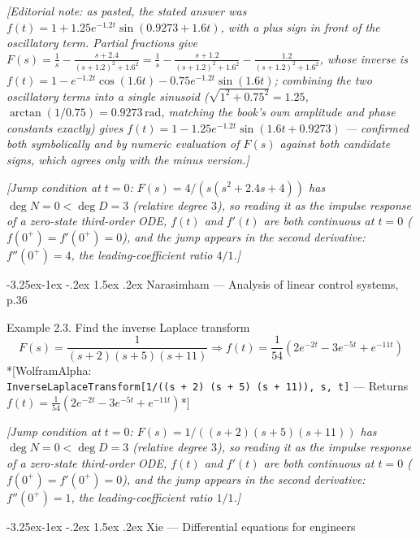 \documentclass[
  11pt,
]{article}
\makeatletter
\providecommand{\implies}{\Longrightarrow}
\renewcommand\paragraph{\@startsection{paragraph}{4}{\z@}%
                                     {-3.25ex\@plus -1ex \@minus -.2ex}%
                                     {1.5ex \@plus .2ex}%
                                     {\normalfont\normalsize\bfseries}}
\makeatother
\begin{document}
\emph{{[}Editorial note: as pasted, the stated answer was
\(f(t) = 1 + 1.25e^{-1.2t}\sin(0.9273 + 1.6t)\), with a plus sign in
front of the oscillatory term. Partial fractions give
\(F(s)=\frac{1}{s}-\frac{s+2.4}{(s+1.2)^2+1.6^2}=\frac{1}{s}-\frac{s+1.2}{(s+1.2)^2+1.6^2}-\frac{1.2}{(s+1.2)^2+1.6^2}\),
whose inverse is \(f(t)=1-e^{-1.2t}\cos(1.6t)-0.75e^{-1.2t}\sin(1.6t)\);
combining the two oscillatory terms into a single sinusoid
(\(\sqrt{1^2+0.75^2}=1.25\), \(\arctan(1/0.75)=0.9273\,\text{rad}\),
matching the book's own amplitude and phase constants exactly) gives
\(f(t)=1-1.25e^{-1.2t}\sin(1.6t+0.9273)\) --- confirmed both
symbolically and by numeric evaluation of \(F(s)\) against both
candidate signs, which agrees only with the minus version.{]}}

\emph{{[}Jump condition at \(t=0\): \(F(s)=4/(s(s^2+2.4s+4))\) has
\(\deg N=0<\deg D=3\) (relative degree \(3\)), so reading it as the
impulse response of a zero-state third-order ODE, \(f(t)\) and \(f'(t)\)
are both continuous at \(t=0\) (\(f(0^+)=f'(0^+)=0\)), and the jump
appears in the second derivative: \(f''(0^+)=4\), the
leading-coefficient ratio \(4/1\).{]}}

\hypertarget{narasimham-analysis-of-linear-control-systems-p.36}{%
\paragraph{Narasimham --- Analysis of linear control systems,
p.36}\label{narasimham-analysis-of-linear-control-systems-p.36}}

Example 2.3. Find the inverse Laplace transform \[
F(s) = \frac{1}{(s+2)(s+5)(s+11)} \implies f(t) = \frac{1}{54}\left(2e^{-2t} - 3e^{-5t} + e^{-11t}\right)
\] *{[}WolframAlpha:
\texttt{InverseLaplaceTransform{[}1/((s\ +\ 2)\ (s\ +\ 5)\ (s\ +\ 11)),\ s,\ t{]}}
--- Returns
\(f(t) = \frac{1}{54}\left(2e^{-2t} - 3e^{-5t} + e^{-11t}\right)\)*{]}

\emph{{[}Jump condition at \(t=0\): \(F(s)=1/((s+2)(s+5)(s+11))\) has
\(\deg N=0<\deg D=3\) (relative degree \(3\)), so reading it as the
impulse response of a zero-state third-order ODE, \(f(t)\) and \(f'(t)\)
are both continuous at \(t=0\) (\(f(0^+)=f'(0^+)=0\)), and the jump
appears in the second derivative: \(f''(0^+)=1\), the
leading-coefficient ratio \(1/1\).{]}}

\hypertarget{xie-differential-equations-for-engineers}{%
\paragraph{Xie --- Differential equations for
engineers}\label{xie-differential-equations-for-engineers}}
\end{document}
